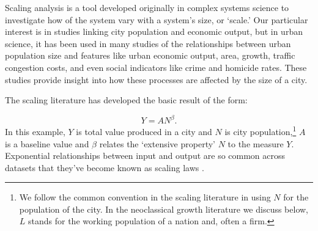 Scaling analysis is a tool developed originally in \glspl{complex system} science to investigate how  of the system vary with a system's size,  or `scale.' Our particular interest is in studies linking city population and economic output, but in urban science, it has been used in many studies of the relationships between urban population size and features like urban economic output, area, growth, traffic congestion costs, and even social indicators like crime and homicide rates. These studies provide insight into how these processes are affected by the size of a city. 

The scaling literature has developed %
the basic result of the form: 

\begin{equation}
Y=AN^\beta.
\end{equation} 
In this example, $Y$ is total value produced in a city and $N$ is city population,\footnote{We follow the common convention in the scaling literature in using $N$ for the population of the city. In the neoclassical growth literature we discuss below, $L$ stands for the working population of a nation and, often a firm.} $A$ is a baseline value and $\beta$ relates the `\gls{extensive property}' $N$ to the measure $Y$.  
Exponential relationships between input and output are so common across datasets that they've become known as \glspl{scaling law} \cite{westScaleUniversalLaws2017, bettencourtGrowthInnovationScaling2007, bettencourtOriginsScalingCities2013, doi:10.1098/rsif.2020.0705, gomez-lievanoStatisticsUrbanScaling2012, kaufmannScalingUrbanAmenities2022, loboUrbanScalingProduction2013, ribeiroMathematicalModelsExplain2021}.

